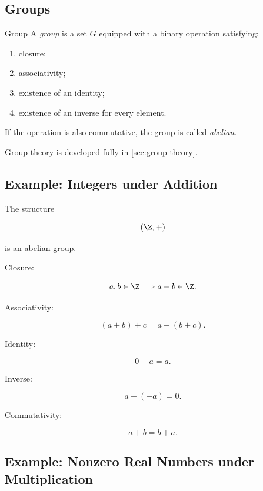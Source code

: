 \subsection{Groups}
\label{subsec:groups-overview}

\begin{definitionbox}{Group}
A \emph{group} is a set \(G\) equipped with a binary operation satisfying:
\begin{enumerate}
    \item closure;
    \item associativity;
    \item existence of an identity;
    \item existence of an inverse for every element.
\end{enumerate}
\end{definitionbox}

If the operation is also commutative, the group is called \emph{abelian}.

Group theory is developed fully in \cref{sec:group-theory}.

\subsection{Example: Integers under Addition}
\label{subsec:integers-addition-group}

The structure

\[ (\Z,+) \]

is an abelian group.

Closure:

\[ a,b\in\Z\Longrightarrow a+b\in\Z. \]

Associativity:

\[ (a+b)+c=a+(b+c). \]

Identity:

\[ 0+a=a. \]

Inverse:

\[ a+(-a)=0. \]

Commutativity:

\[ a+b=b+a. \]

\subsection{Example: Nonzero Real Numbers under Multiplication}
\label{subsec:nonzero-reals-multiplication}

